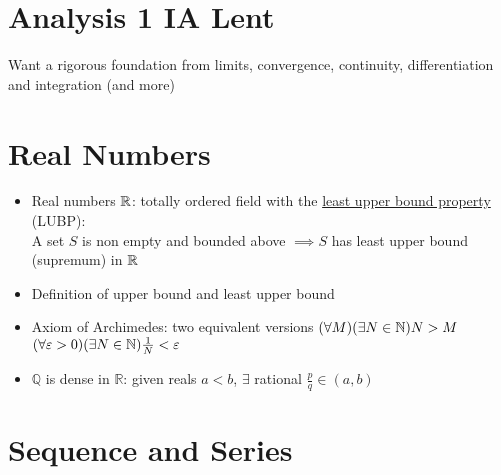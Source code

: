 



\section*{Analysis 1 \hfill IA Lent}
Want a rigorous foundation from limits, convergence, continuity, differentiation and integration (and more)

\section{Real Numbers}
\begin{itemize}
      \item Real numbers $\mathbb{R}$: totally ordered field with the \underline{least upper bound property} (LUBP): \\
            A set $S$ is non empty and bounded above $\implies S$ has least upper bound (supremum) in $\mathbb{R}$
      \item Definition of upper bound and least upper bound
      \item Axiom of Archimedes: two equivalent versions
            $ (\forall M)(\exists N \in \mathbb{N}) N > M$ \\
            $(\forall \varepsilon > 0)(\exists N \in \mathbb{N} )\frac{1}{N} < \varepsilon$
      \item $\mathbb{Q}$  is dense in $\mathbb{R}$: given reals $a < b$, $\exists$ rational $ \frac{p}{q} \in (a,b)$
\end{itemize}

\section{Sequence and Series}
